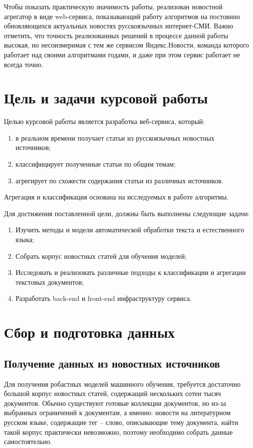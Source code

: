 \documentclass[a4paper, 14pt]{extarticle}
\begin{document}
Чтобы показать практическую значимость работы, реализован новостной агрегатор в виде web-сервиса, показывающий работу алгоритмов на постоянно обновляющихся актуальных новостях русскоязычных интернет-СМИ. Важно отметить, что точность реализованных решений в процессе данной работы высокая, но несоизмеримая с тем же сервисом Яндекс.Новости, команда которого работает над своими алгоритмами годами, и даже при этом сервис работает не всегда точно. %

\section{Цель и задачи курсовой работы}
Целью курсовой работы является разработка веб-сервиса, который:
\begin{enumerate}
	\item в реальном времени получает статьи из русскоязычных новостных источников;
	\item классифицирует полученные статьи по общим темам;
	\item агрегирует по схожести содержания статьи из различных источников.
\end{enumerate}
Агрегация и классификация основана на исследуемых в работе алгоритмы.

Для достижения поставленной цели, должны быть выполнены следующие задачи:
\begin{enumerate}
	\item Изучить методы и модели автоматической обработки текста и естественного языка;
	\item Собрать корпус новостных статей для обучения моделей;
	\item Исследовать и реализовать различные подходы к классификации и агрегации текстовых документов;
	\item Разработать back-end и front-end инфраструктуру сервиса.
\end{enumerate}

\section{Сбор и подготовка данных}
\subsection{Получение данных из новостных источников}
Для получения робастных моделей машинного обучения, требуется достаточно большой корпус новостных статей,
содержащий нескольких сотен тысяч документов. Обычно существуют готовые коллекции документов, но из-за выбранных ограничений к документам, а именно: новости на литературном русском языке, содержащие тег -- слово, описывающие тему документа, найти такой корпус практически невозможно, поэтому необходимо собрать данные самостоятельно.
\end{document}
